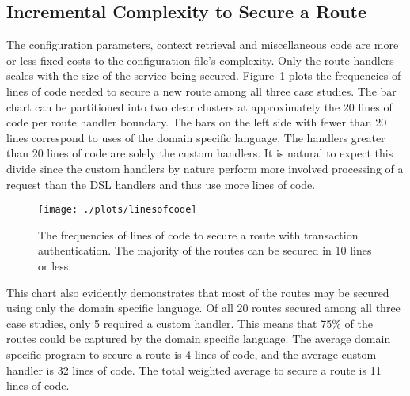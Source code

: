 \subsection{Incremental Complexity to Secure a Route}


The configuration parameters, context retrieval and miscellaneous code are more or less fixed costs to the configuration file's complexity. Only the route handlers scales with the size of the service being secured. Figure~\ref{Fig:IncrementalComplexity} plots the frequencies of lines of code needed to secure a new route among all three case studies. The bar chart can be partitioned into two clear clusters at approximately the 20 lines of code per route handler boundary. The bars on the left side with fewer than 20 lines correspond to uses of the domain specific language. The handlers greater than 20 lines of code are solely the custom handlers. It is natural to expect this divide since the custom handlers by nature perform more involved processing of a request than the DSL handlers and thus use more lines of code.


\begin{figure}[h]
  \centering
  \texttt{[image: ./plots/linesofcode]}
  \caption{The frequencies of lines of code to secure a route with transaction authentication. The majority of the routes can be secured in 10 lines or less.}
  \label{Fig:IncrementalComplexity}
\end{figure}

This chart also evidently demonstrates that most of the routes may be secured using only the domain specific language. Of all 20 routes secured among all three case studies, only 5 required a custom handler. This means that 75\% of the routes could be captured by the domain specific language. The average domain specific program to secure a route is 4 lines of code, and the average custom handler is 32 lines of code. The total weighted average to secure a route is 11 lines of code.

